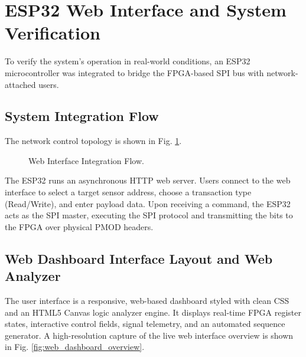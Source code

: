 \documentclass[conference]{IEEEtran}
\begin{document}
\section{ESP32 Web Interface and System Verification}
To verify the system's operation in real-world conditions, an ESP32 microcontroller was integrated to bridge the FPGA-based SPI bus with network-attached users.

\subsection{System Integration Flow}
The network control topology is shown in Fig. \ref{fig:web_interface}.

\begin{figure}[htbp]
\centering
{}
\caption{Web Interface Integration Flow.}
\label{fig:web_interface}
\end{figure}

The ESP32 runs an asynchronous HTTP web server. Users connect to the web interface to select a target sensor address, choose a transaction type (Read/Write), and enter payload data. Upon receiving a command, the ESP32 acts as the SPI master, executing the SPI protocol and transmitting the bits to the FPGA over physical PMOD headers.

\subsection{Web Dashboard Interface Layout and Web Analyzer}
The user interface is a responsive, web-based dashboard styled with clean CSS and an HTML5 Canvas logic analyzer engine. It displays real-time FPGA register states, interactive control fields, signal telemetry, and an automated sequence generator. A high-resolution capture of the live web interface overview is shown in Fig. \ref{fig:web_dashboard_overview}.
\end{document}
